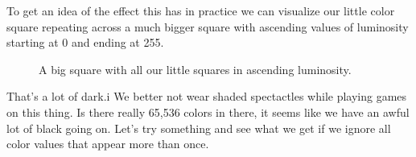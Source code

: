 To get an idea of the effect this has in practice we can visualize our little color square repeating across a much
bigger square with ascending values of luminosity starting at 0 and ending at 255.
\begin{figure}[H]
    \centering
    \begin{adjustbox}{width=5cm,center}
    \end{adjustbox}
\caption{A big square with all our little squares in ascending luminosity.}
\end{figure}

That's a lot of dark.i We better not wear shaded spectactles while playing games on this thing. Is there really 65,536 colors in there,
it seems like we have an awful lot of black going on. Let's try something and see what we get if we ignore all color values that appear
more than once.

